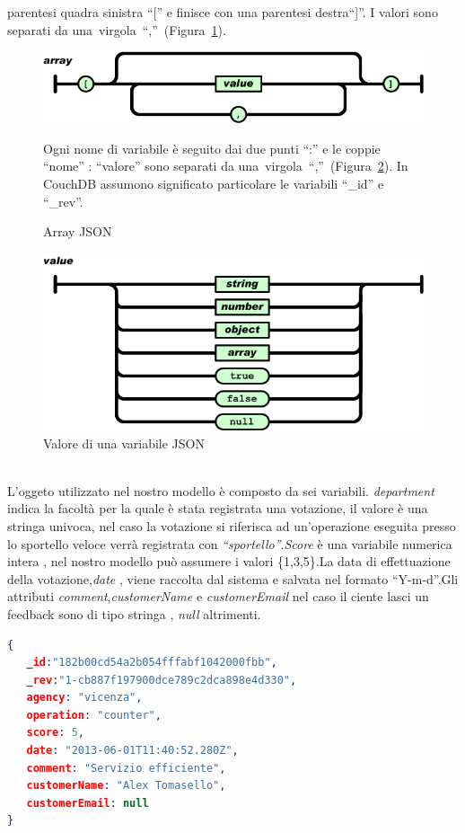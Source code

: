 parentesi quadra sinistra ``{[}'' e finisce con una parentesi destra``{]}''. I
valori sono separati da una~virgola~``,''~(Figura~\ref{fig:jsonarray}).
\begin{figure}[!h]
\begin{center}
    \includegraphics[scale=0.50]{icons/jsonarray.png}
    \caption{Array JSON}
    \label{fig:jsonarray}
\end{center}
Ogni nome di variabile è seguito dai due punti ``:'' e le coppie
``nome'' : ``valore'' sono separati
da una~virgola~``,''~(Figura~\ref{fig:jsonvalue}). In CouchDB assumono
significato particolare le variabili ``\_id'' e ``\_rev''. 

\end{figure}
\begin{figure}[!h]
  \begin{center}
      \includegraphics[scale=0.50]{icons/jsonvalue.png}
      \caption{Valore di una variabile JSON}
      \label{fig:jsonvalue}
  \end{center}
\end{figure}

\\L'oggeto utilizzato nel nostro modello è composto da sei variabili.
\emph{department} indica la facoltà per la quale è stata registrata una
votazione, il valore è una stringa univoca, nel caso la votazione si
riferisca ad un'operazione eseguita presso lo sportello veloce verrà registrata
con \emph{``sportello''}.\emph{Score} è una variabile numerica intera , nel
nostro modello può assumere i valori \{1,3,5\}.La data di effettuazione della
votazione,\emph{date} , viene raccolta dal sistema e salvata nel formato
``Y-m-d''.Gli attributi \emph{comment},\emph{customerName} e
\emph{customerEmail} nel caso il ciente lasci un feedback sono di tipo stringa , \emph{null} altrimenti. 
\\
\begin{lstlisting}[language=json] 
{ 
   _id:"182b00cd54a2b054fffabf1042000fbb", 
   _rev:"1-cb887f197900dce789c2dca898e4d330", 
   agency: "vicenza",
   operation: "counter",
   score: 5,
   date: "2013-06-01T11:40:52.280Z",
   comment: "Servizio efficiente",
   customerName: "Alex Tomasello",
   customerEmail: null
}
\end{lstlisting} 
